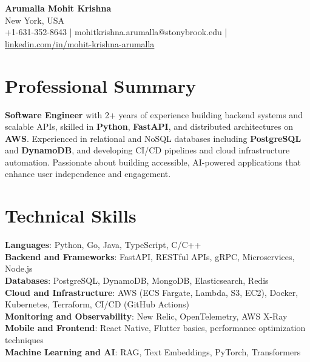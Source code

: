 \documentclass[letterpaper,11pt]{article}
\begin{document}
\begin{center}
  {\Large \textbf{Arumalla Mohit Krishna}} \\
  New York, USA \\
  +1-631-352-8643 \enspace | \enspace mohitkrishna.arumalla@stonybrook.edu \enspace | \enspace \href{https://www.linkedin.com/in/mohit-krishna-arumalla}{linkedin.com/in/mohit-krishna-arumalla}
\end{center}

\section{Professional Summary}
  \begin{itemize}[leftmargin=0.15in, label={}]
    \small{\item{
     \textbf{Software Engineer} with 2+ years of experience building backend systems and scalable APIs, skilled in \textbf{Python}, \textbf{FastAPI}, and distributed architectures on \textbf{AWS}. Experienced in relational and NoSQL databases including \textbf{PostgreSQL} and \textbf{DynamoDB}, and developing CI/CD pipelines and cloud infrastructure automation. Passionate about building accessible, AI-powered applications that enhance user independence and engagement.
    }}
  \end{itemize}
\vspace{-16pt}

\section{Technical Skills}
 \begin{itemize}[leftmargin=0.15in, label={}]
    \small{\item{
     \textbf{Languages}: Python, Go, Java, TypeScript, C/C++ \\
     \textbf{Backend and Frameworks}: FastAPI, RESTful APIs, gRPC, Microservices, Node.js \\
     \textbf{Databases}: PostgreSQL, DynamoDB, MongoDB, Elasticsearch, Redis \\
     \textbf{Cloud and Infrastructure}: AWS (ECS Fargate, Lambda, S3, EC2), Docker, Kubernetes, Terraform, CI/CD (GitHub Actions) \\
     \textbf{Monitoring and Observability}: New Relic, OpenTelemetry, AWS X-Ray \\
     \textbf{Mobile and Frontend}: React Native, Flutter basics, performance optimization techniques \\
     \textbf{Machine Learning and AI}: RAG, Text Embeddings, PyTorch, Transformers
    }}
 \end{itemize}
\vspace{-16pt}
\end{document}
